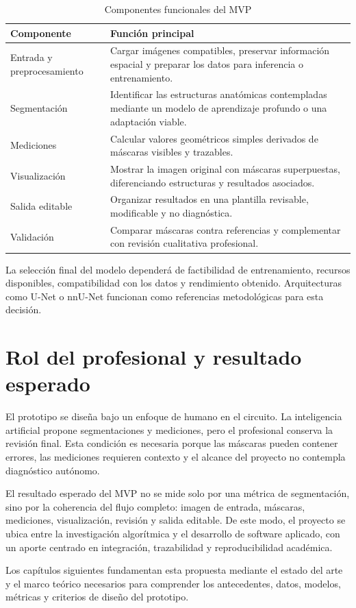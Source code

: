\begin{table}[htbp]
\centering
\caption{Componentes funcionales del MVP}
\label{tab:componentes_mvp}
\small
\begin{tabularx}{\textwidth}{p{} X}
\hline
\textbf{Componente} & \textbf{Funci\'on principal} \\
\hline
Entrada y preprocesamiento & Cargar im\'agenes compatibles, preservar informaci\'on espacial y preparar los datos para inferencia o entrenamiento. \\
Segmentaci\'on & Identificar las estructuras anat\'omicas contempladas mediante un modelo de aprendizaje profundo o una adaptaci\'on viable. \\
Mediciones & Calcular valores geom\'etricos simples derivados de m\'ascaras visibles y trazables. \\
Visualizaci\'on & Mostrar la imagen original con m\'ascaras superpuestas, diferenciando estructuras y resultados asociados. \\
Salida editable & Organizar resultados en una plantilla revisable, modificable y no diagn\'ostica. \\
Validaci\'on & Comparar m\'ascaras contra referencias y complementar con revisi\'on cualitativa profesional. \\
\hline
\end{tabularx}
\end{table}

La selecci\'on final del modelo depender\'a de factibilidad de entrenamiento, recursos disponibles, compatibilidad con los datos y rendimiento obtenido. Arquitecturas como U-Net o nnU-Net funcionan como referencias metodol\'ogicas para esta decisi\'on.

\section{Rol del profesional y resultado esperado}

El prototipo se dise\~na bajo un enfoque de humano en el circuito. La inteligencia artificial propone segmentaciones y mediciones, pero el profesional conserva la revisi\'on final. Esta condici\'on es necesaria porque las m\'ascaras pueden contener errores, las mediciones requieren contexto y el alcance del proyecto no contempla diagn\'ostico aut\'onomo.

El resultado esperado del MVP no se mide solo por una m\'etrica de segmentaci\'on, sino por la coherencia del flujo completo: imagen de entrada, m\'ascaras, mediciones, visualizaci\'on, revisi\'on y salida editable. De este modo, el proyecto se ubica entre la investigaci\'on algor\'itmica y el desarrollo de software aplicado, con un aporte centrado en integraci\'on, trazabilidad y reproducibilidad acad\'emica.

Los cap\'itulos siguientes fundamentan esta propuesta mediante el estado del arte y el marco te\'orico necesarios para comprender los antecedentes, datos, modelos, m\'etricas y criterios de dise\~no del prototipo.
